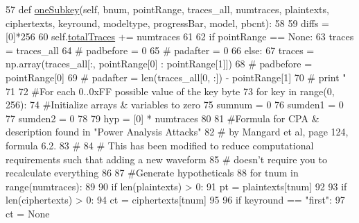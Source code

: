 \begin{DoxyCode}
57     \textcolor{keyword}{def }\hyperlink{classsoftware_1_1chipwhisperer_1_1analyzer_1_1attacks_1_1cpa__algorithms_1_1experimentalchannelinfo_1_1CPAProgressiveOneSubkey_add306183e4bf6f9a9c6605166a02c58b}{oneSubkey}(self, bnum, pointRange, traces\_all, numtraces, plaintexts, ciphertexts, 
      keyround, modeltype, progressBar, model, pbcnt):
58 
59         diffs = [0]*256
60         self.\hyperlink{classsoftware_1_1chipwhisperer_1_1analyzer_1_1attacks_1_1cpa__algorithms_1_1experimentalchannelinfo_1_1CPAProgressiveOneSubkey_a1f9a90b97cee6e8624329c0de7c2e292}{totalTraces} += numtraces
61 
62         \textcolor{keywordflow}{if} pointRange == \textcolor{keywordtype}{None}:
63             traces = traces\_all
64             \textcolor{comment}{# padbefore = 0}
65             \textcolor{comment}{# padafter = 0}
66         \textcolor{keywordflow}{else}:
67             traces = np.array(traces\_all[:, pointRange[0] : pointRange[1]])
68             \textcolor{comment}{# padbefore = pointRange[0]}
69             \textcolor{comment}{# padafter = len(traces\_all[0, :]) - pointRange[1]}
70             \textcolor{comment}{# print "%
71 
72         \textcolor{comment}{#For each 0..0xFF possible value of the key byte}
73         \textcolor{keywordflow}{for} key \textcolor{keywordflow}{in} range(0, 256):
74             \textcolor{comment}{#Initialize arrays & variables to zero}
75             sumnum = 0
76             sumden1 = 0
77             sumden2 = 0
78 
79             hyp = [0] * numtraces
80 
81             \textcolor{comment}{#Formula for CPA & description found in "Power Analysis Attacks"}
82             \textcolor{comment}{# by Mangard et al, page 124, formula 6.2.}
83             \textcolor{comment}{#}
84             \textcolor{comment}{# This has been modified to reduce computational requirements such that adding a new waveform}
85             \textcolor{comment}{# doesn't require you to recalculate everything}
86 
87             \textcolor{comment}{#Generate hypotheticals}
88             \textcolor{keywordflow}{for} tnum \textcolor{keywordflow}{in} range(numtraces):
89 
90                 \textcolor{keywordflow}{if} len(plaintexts) > 0:
91                     pt = plaintexts[tnum]
92 
93                 \textcolor{keywordflow}{if} len(ciphertexts) > 0:
94                     ct = ciphertexts[tnum]
95 
96                 \textcolor{keywordflow}{if} keyround == \textcolor{stringliteral}{"first"}:
97                     ct = \textcolor{keywordtype}{None}
}
\end{DoxyCode}
